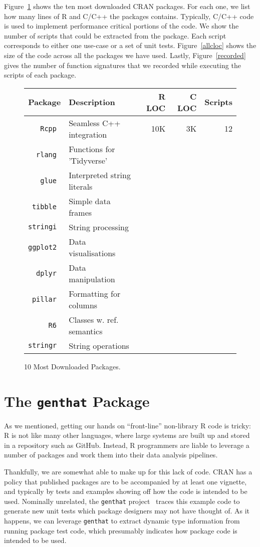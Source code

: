 \documentclass[acmsmall,10pt,review,anonymous]{acmart}\settopmatter{printfolios=true,printccs=false,printacmref=false}
\begin{document}
Figure~\ref{most} shows the ten most downloaded CRAN packages.  For each
one, we list how many lines of R and C/C++ the packages contains.
Typically, C/C++ code is used to implement performance critical portions of
the code. We show the number of scripts that could be extracted from the
package. Each script corresponds to either one use-case or a set of unit
tests.  Figure~\ref{allcloc} shows the size of the code across all the
packages we have used.  Lastly, Figure~\ref{recorded} gives the number of
function signatures that we recorded while executing the scripts of each
package.

\begin{figure}[!th]{\footnotesize\begin{tabular}{@{}r||l|r|r|r@{}}\hline
\bf Package & \bf Description & \bf R LOC &\bf C LOC &\bf Scripts\\\hline
\tt Rcpp  & Seamless C++ integration & 10K & 3K & 12 \\
\tt rlang & Functions for 'Tidyverse'&&& \\
\tt glue  & Interpreted string literals&&& \\
\tt tibble & Simple data frames&& &\\
\tt stringi &  String processing &&& \\
\tt ggplot2 & Data visualisations&& &\\
\tt dplyr  &  Data manipulation&&& \\
\tt pillar & Formatting for columns&&& \\
\tt R6 & Classes w. ref. semantics&&& \\
\tt stringr & String operations&&& \\
\end{tabular}}\caption{10 Most Downloaded Packages.}\label{most}
\end{figure}

%
%
%
%
\section{The \texttt{genthat} Package}
\label{sec:genthat}

As we mentioned, getting our hands on ``front-line'' non-library R code is tricky: 
R is not like many other languages, where large systems are built up and stored in a repository such as GitHub.  
Instead, R programmers are liable to leverage a number of packages and work them into their data analysis pipelines.

Thankfully, we are somewhat able to make up for this lack of code.
CRAN has a policy that published packages are to be accompanied by at least one vignette, and typically by tests and examples showing off how the code is intended to be used.  
Nominally unrelated, the {\tt genthat} project~\cite{issta18} traces this example code to generate new unit tests which package designers may not have thought of.
As it happens, we can leverage {\tt genthat} to extract dynamic type information from running package test code, which presumably indicates how package code is intended to be used.
\end{document}
